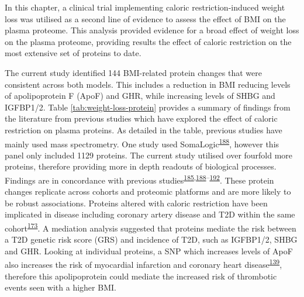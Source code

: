 \documentclass[11pt,twoside]{bristolthesis}
\begin{document}
In this chapter, a clinical trial implementing caloric restriction-induced weight loss was utilised as a second line of evidence to assess the effect of BMI on the plasma proteome. This analysis provided evidence for a broad effect of weight loss on the plasma proteome, providing results the effect of caloric restriction on the most extensive set of proteins to date.

The current study identified 144 BMI-related protein changes that were consistent across both models. This includes a reduction in BMI reducing levels of apolipoprotein F (ApoF) and GHR, while increasing levels of SHBG and IGFBP1/2. Table \ref{tab:weight-loss-protein} provides a summary of findings from the literature from previous studies which have explored the effect of caloric restriction on plasma proteins. As detailed in the table, previous studies have mainly used mass spectrometry. One study used SomaLogic\textsuperscript{\protect\hyperlink{ref-Carayol2017}{188}}, however this panel only included 1129 proteins. The current study utilised over fourfold more proteins, therefore providing more in depth readouts of biological processes. Findings are in concordance with previous studies\textsuperscript{\protect\hyperlink{ref-Figarska2020}{185},\protect\hyperlink{ref-Carayol2017}{188}--\protect\hyperlink{ref-Bruderer2019}{192}}. These protein changes replicate across cohorts and proteomic platforms and are more likely to be robust associations. Proteins altered with caloric restriction have been implicated in disease including coronary artery disease and T2D within the same cohort\textsuperscript{\protect\hyperlink{ref-Ritchie2019}{173}}. A mediation analysis suggested that proteins mediate the risk between a T2D genetic risk score (GRS) and incidence of T2D, such as IGFBP1/2, SHBG and GHR. Looking at individual proteins, a SNP which increases levels of ApoF also increases the risk of myocardial infarction and coronary heart disease\textsuperscript{\protect\hyperlink{ref-Liu2021}{139}}, therefore this apolipoprotein could mediate the increased risk of thrombotic events seen with a higher BMI.
\end{document}
